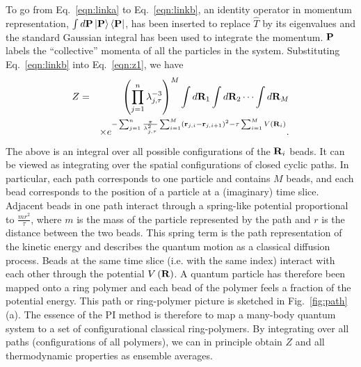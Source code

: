 \documentclass[12pt]{iopart}
\begin{document}
To go from Eq.~\ref{eqn:linka} to Eq.~\ref{eqn:linkb}, an identity operator in momentum representation, $\int d{\bf P} \left| {\bf P} \right>\left< {\bf P} \right|$, has been inserted to replace $\hat{T}$ by its eigenvalues and the standard Gaussian integral has been used to integrate the momentum. 
${\bf P}$ labels the ``collective'' momenta of all the particles in the system.
Substituting Eq.~\ref{eqn:linkb} into Eq.~\ref{eqn:z1}, we have
\begin{eqnarray}
Z&=&\left(\prod_{j=1}^n \lambda_{j,\tau}^{-3} \right)^M \int d {\bf R}_1\int d {\bf R}_2\cdots\int d {\bf R}_M \nonumber\\
&&\times e^{ -\sum_{j=1}^n \frac{\pi}{\lambda_{j,\tau}^2} \sum_{i=1}^M  \left( {\bf r}_{j,i}- {\bf r}_{j,i+1}\right)^2 -\tau \sum_{i=1}^MV\left( {\bf R}_i \right) }. \label{eqn:z2}
\end{eqnarray}
The above is an integral over all possible  configurations of the ${\bf R}_i$ beads.
It can be viewed as integrating over the spatial configurations of closed cyclic paths.
In particular, each path corresponds to one particle and contains $M$ beads, and each bead corresponds to the position of a particle at a (imaginary) time slice. 
Adjacent beads in one path interact through a spring-like potential proportional to $\frac{mr^2}{\tau}$, where $m$ is the mass of the particle represented by the path and $r$ is the distance between the two beads. 
This spring term is the path representation of the kinetic energy and describes the quantum motion as a classical diffusion process. 
Beads at the same time slice (i.e. with the same index) interact with each other through the potential $V\left( {\bf R} \right)$.
A quantum particle has therefore been mapped onto a ring polymer and each bead of the polymer feels a fraction of the potential energy.
This path or ring-polymer picture is sketched in Fig.~\ref{fig:path}(a). 
The essence of the PI method is therefore to map a many-body quantum system to a set of configurational classical ring-polymers. 
By integrating over all paths (configurations of all polymers), we can in principle obtain $Z$ and all thermodynamic properties as ensemble averages.
\end{document}
